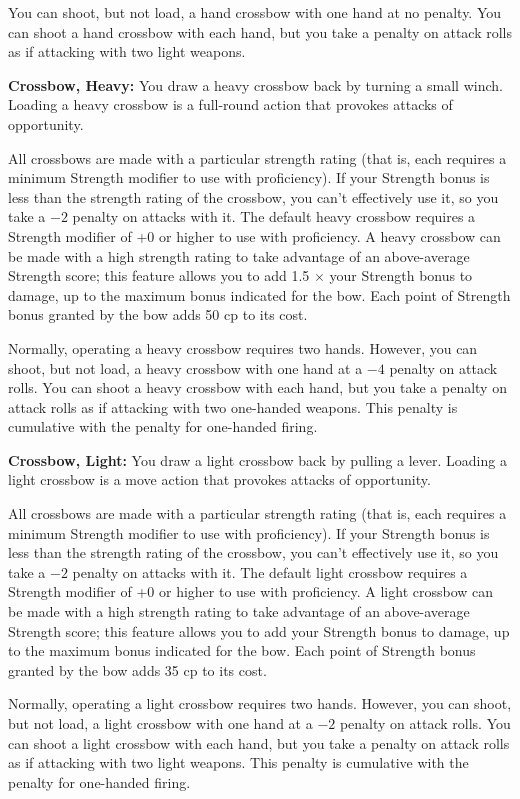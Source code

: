 You can shoot, but not load, a hand crossbow with one hand at no penalty. You can shoot a hand crossbow with each hand, but you take a penalty on attack rolls as if attacking with two light weapons. 

\textbf{Crossbow, Heavy:} You draw a heavy crossbow back by turning a small winch. Loading a heavy crossbow is a full-round action that provokes attacks of opportunity.

All crossbows are made with a particular strength rating (that is, each requires a minimum Strength modifier to use with proficiency). If your Strength bonus is less than the strength rating of the crossbow, you can't effectively use it, so you take a $-2$ penalty on attacks with it. The default heavy crossbow requires a Strength modifier of +0 or higher to use with proficiency. A heavy crossbow can be made with a high strength rating to take advantage of an above-average Strength score; this feature allows you to add 1.5 $\times$ your Strength bonus to damage, up to the maximum bonus indicated for the bow. Each point of Strength bonus granted by the bow adds 50 cp to its cost.

Normally, operating a heavy crossbow requires two hands. However, you can shoot, but not load, a heavy crossbow with one hand at a $-4$ penalty on attack rolls. You can shoot a heavy crossbow with each hand, but you take a penalty on attack rolls as if attacking with two one-handed weapons. This penalty is cumulative with the penalty for one-handed firing.

\textbf{Crossbow, Light:} You draw a light crossbow back by pulling a lever. Loading a light crossbow is a move action that provokes attacks of opportunity.

All crossbows are made with a particular strength rating (that is, each requires a minimum Strength modifier to use with proficiency). If your Strength bonus is less than the strength rating of the crossbow, you can't effectively use it, so you take a $-2$ penalty on attacks with it. The default light crossbow requires a Strength modifier of +0 or higher to use with proficiency. A light crossbow can be made with a high strength rating to take advantage of an above-average Strength score; this feature allows you to add your Strength bonus to damage, up to the maximum bonus indicated for the bow. Each point of Strength bonus granted by the bow adds 35 cp to its cost.

Normally, operating a light crossbow requires two hands. However, you can shoot, but not load, a light crossbow with one hand at a $-2$ penalty on attack rolls. You can shoot a light crossbow with each hand, but you take a penalty on attack rolls as if attacking with two light weapons. This penalty is cumulative with the penalty for one-handed firing. 

